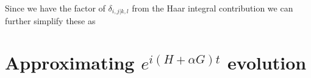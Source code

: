 \documentclass{article}
\begin{document}
 Since we have the factor of $\delta_{i,j | k,l}$ from the Haar integral contribution we can further simplify these as
\section{Approximating $e^{i (H + \alpha G) t}$ evolution}




\appendix
\end{document}
